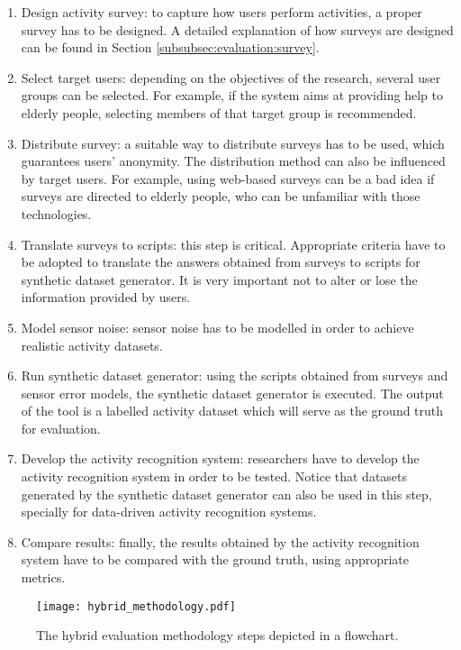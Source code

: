\begin{enumerate}
 \item Design activity survey: to capture how users perform activities, a proper survey has to be designed. A detailed explanation of how surveys are designed can be found in Section \ref{subsubsec:evaluation:survey}.
 \item Select target users: depending on the objectives of the research, several user groups can be selected. For example, if the system aims at providing help to elderly people, selecting members of that target group is recommended.
 \item Distribute survey: a suitable way to distribute surveys has to be used, which guarantees users' anonymity. The distribution method can also be influenced by target users. For example, using web-based surveys can be a bad idea if surveys are directed to elderly people, who can be unfamiliar with those technologies. 
 \item Translate surveys to scripts: this step is critical. Appropriate criteria have to be adopted to translate the answers obtained from surveys to scripts for synthetic dataset generator. It is very important not to alter or lose the information provided by users.
 \item Model sensor noise: sensor noise has to be modelled in order to achieve realistic activity datasets. 
 \item Run synthetic dataset generator: using the scripts obtained from surveys and sensor error models, the synthetic dataset generator is executed. The output of the tool is a labelled activity dataset which will serve as the ground truth for evaluation.
 \item Develop the activity recognition system: researchers have to develop the activity recognition system in order to be tested. Notice that datasets generated by the synthetic dataset generator can also be used in this step, specially for data-driven activity recognition systems.
 \item Compare results: finally, the results obtained by the activity recognition system have to be compared with the ground truth, using appropriate metrics.
\end{enumerate}

\begin{figure}[htbp]
\centering
\texttt{[image: hybrid\_methodology.pdf]}
    \caption{The hybrid evaluation methodology steps depicted in a flowchart.}
    \label{fig-methodology}
\end{figure}


